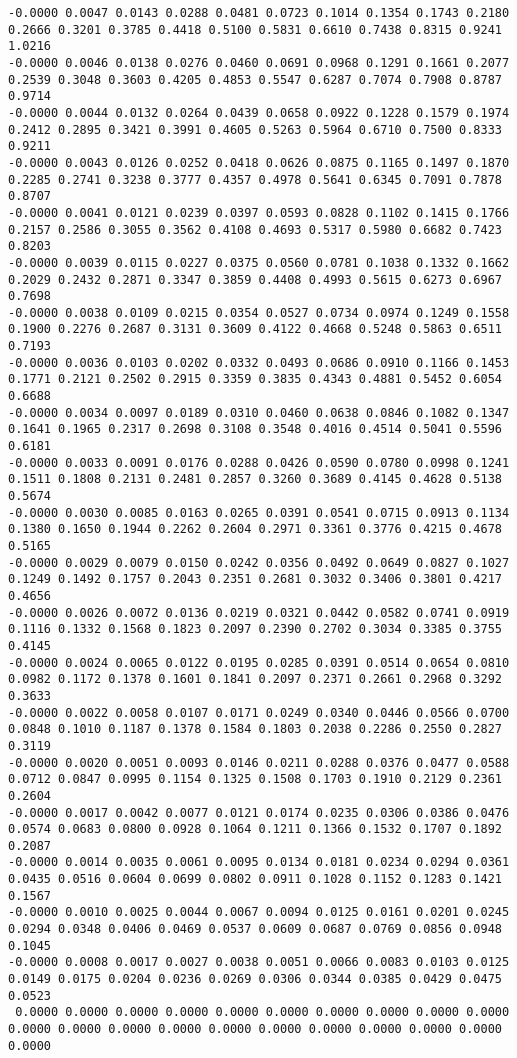 {\tiny
\begin{verbatim}
-0.0000 0.0047 0.0143 0.0288 0.0481 0.0723 0.1014 0.1354 0.1743 0.2180 0.2666 0.3201 0.3785 0.4418 0.5100 0.5831 0.6610 0.7438 0.8315 0.9241 1.0216
-0.0000 0.0046 0.0138 0.0276 0.0460 0.0691 0.0968 0.1291 0.1661 0.2077 0.2539 0.3048 0.3603 0.4205 0.4853 0.5547 0.6287 0.7074 0.7908 0.8787 0.9714
-0.0000 0.0044 0.0132 0.0264 0.0439 0.0658 0.0922 0.1228 0.1579 0.1974 0.2412 0.2895 0.3421 0.3991 0.4605 0.5263 0.5964 0.6710 0.7500 0.8333 0.9211
-0.0000 0.0043 0.0126 0.0252 0.0418 0.0626 0.0875 0.1165 0.1497 0.1870 0.2285 0.2741 0.3238 0.3777 0.4357 0.4978 0.5641 0.6345 0.7091 0.7878 0.8707
-0.0000 0.0041 0.0121 0.0239 0.0397 0.0593 0.0828 0.1102 0.1415 0.1766 0.2157 0.2586 0.3055 0.3562 0.4108 0.4693 0.5317 0.5980 0.6682 0.7423 0.8203
-0.0000 0.0039 0.0115 0.0227 0.0375 0.0560 0.0781 0.1038 0.1332 0.1662 0.2029 0.2432 0.2871 0.3347 0.3859 0.4408 0.4993 0.5615 0.6273 0.6967 0.7698
-0.0000 0.0038 0.0109 0.0215 0.0354 0.0527 0.0734 0.0974 0.1249 0.1558 0.1900 0.2276 0.2687 0.3131 0.3609 0.4122 0.4668 0.5248 0.5863 0.6511 0.7193
-0.0000 0.0036 0.0103 0.0202 0.0332 0.0493 0.0686 0.0910 0.1166 0.1453 0.1771 0.2121 0.2502 0.2915 0.3359 0.3835 0.4343 0.4881 0.5452 0.6054 0.6688
-0.0000 0.0034 0.0097 0.0189 0.0310 0.0460 0.0638 0.0846 0.1082 0.1347 0.1641 0.1965 0.2317 0.2698 0.3108 0.3548 0.4016 0.4514 0.5041 0.5596 0.6181
-0.0000 0.0033 0.0091 0.0176 0.0288 0.0426 0.0590 0.0780 0.0998 0.1241 0.1511 0.1808 0.2131 0.2481 0.2857 0.3260 0.3689 0.4145 0.4628 0.5138 0.5674
-0.0000 0.0030 0.0085 0.0163 0.0265 0.0391 0.0541 0.0715 0.0913 0.1134 0.1380 0.1650 0.1944 0.2262 0.2604 0.2971 0.3361 0.3776 0.4215 0.4678 0.5165
-0.0000 0.0029 0.0079 0.0150 0.0242 0.0356 0.0492 0.0649 0.0827 0.1027 0.1249 0.1492 0.1757 0.2043 0.2351 0.2681 0.3032 0.3406 0.3801 0.4217 0.4656
-0.0000 0.0026 0.0072 0.0136 0.0219 0.0321 0.0442 0.0582 0.0741 0.0919 0.1116 0.1332 0.1568 0.1823 0.2097 0.2390 0.2702 0.3034 0.3385 0.3755 0.4145
-0.0000 0.0024 0.0065 0.0122 0.0195 0.0285 0.0391 0.0514 0.0654 0.0810 0.0982 0.1172 0.1378 0.1601 0.1841 0.2097 0.2371 0.2661 0.2968 0.3292 0.3633
-0.0000 0.0022 0.0058 0.0107 0.0171 0.0249 0.0340 0.0446 0.0566 0.0700 0.0848 0.1010 0.1187 0.1378 0.1584 0.1803 0.2038 0.2286 0.2550 0.2827 0.3119
-0.0000 0.0020 0.0051 0.0093 0.0146 0.0211 0.0288 0.0376 0.0477 0.0588 0.0712 0.0847 0.0995 0.1154 0.1325 0.1508 0.1703 0.1910 0.2129 0.2361 0.2604
-0.0000 0.0017 0.0042 0.0077 0.0121 0.0174 0.0235 0.0306 0.0386 0.0476 0.0574 0.0683 0.0800 0.0928 0.1064 0.1211 0.1366 0.1532 0.1707 0.1892 0.2087
-0.0000 0.0014 0.0035 0.0061 0.0095 0.0134 0.0181 0.0234 0.0294 0.0361 0.0435 0.0516 0.0604 0.0699 0.0802 0.0911 0.1028 0.1152 0.1283 0.1421 0.1567
-0.0000 0.0010 0.0025 0.0044 0.0067 0.0094 0.0125 0.0161 0.0201 0.0245 0.0294 0.0348 0.0406 0.0469 0.0537 0.0609 0.0687 0.0769 0.0856 0.0948 0.1045
-0.0000 0.0008 0.0017 0.0027 0.0038 0.0051 0.0066 0.0083 0.0103 0.0125 0.0149 0.0175 0.0204 0.0236 0.0269 0.0306 0.0344 0.0385 0.0429 0.0475 0.0523
 0.0000 0.0000 0.0000 0.0000 0.0000 0.0000 0.0000 0.0000 0.0000 0.0000 0.0000 0.0000 0.0000 0.0000 0.0000 0.0000 0.0000 0.0000 0.0000 0.0000 0.0000
\end{verbatim}
}
